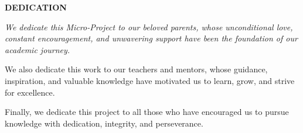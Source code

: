 \thispagestyle{empty}

\vspace*{0.20\textheight}

\begin{center}

{\Large\bfseries DEDICATION}

\vspace{2cm}

\itshape
We dedicate this Micro-Project to our beloved parents, whose unconditional love, constant encouragement, and unwavering support have been the foundation of our academic journey.

\vspace{0.8cm}

We also dedicate this work to our teachers and mentors, whose guidance, inspiration, and valuable knowledge have motivated us to learn, grow, and strive for excellence.

\vspace{0.8cm}

Finally, we dedicate this project to all those who have encouraged us to pursue knowledge with dedication, integrity, and perseverance.

\vspace{2cm}

\begin{flushright}
\textbf{\studentA}\\
\textbf{\studentB}
\end{flushright}

\end{center}

\clearpage